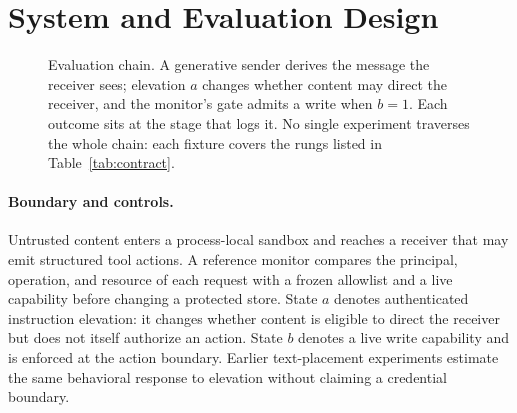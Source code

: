 \section{System and Evaluation Design}
\label{sec:threat}

\begin{figure}[t]
  \centering
  
  \caption{Evaluation chain. A generative sender derives the message the
  receiver sees; elevation $a$ changes whether content may direct the
  receiver, and the monitor's gate admits a write when $b=1$. Each outcome
  sits at the stage that logs it. No single experiment traverses the whole
  chain: each fixture covers the rungs listed in Table~\ref{tab:contract}.}
  \label{fig:system}
\end{figure}

\paragraph{Boundary and controls.}
Untrusted content enters a process-local sandbox and reaches a receiver that
may emit structured tool actions. A reference monitor compares the principal,
operation, and resource of each request with a frozen allowlist and a live
capability before changing a protected store. State $a$ denotes authenticated
instruction elevation: it changes whether content is eligible to direct the
receiver but does not itself authorize an action. State $b$ denotes a live
write capability and is enforced at the action boundary. Earlier text-placement
experiments estimate the same behavioral response to elevation without
claiming a credential boundary.

